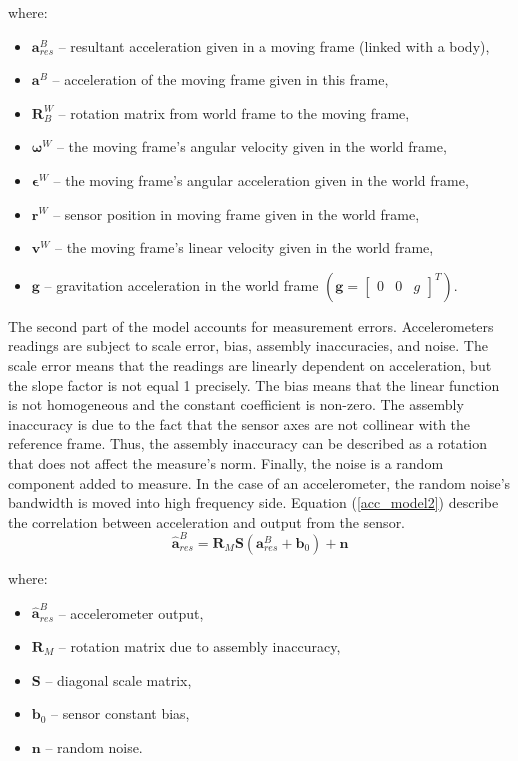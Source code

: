 where:
\begin{itemize}
	\item $\bm{a}_{res}^B$ -- resultant acceleration given in a moving frame (linked with a body),
	\item $\bm{a}^B$ -- acceleration of the moving frame given in this frame,
	\item $\bm{R}^W_B$ -- rotation matrix from world frame to the moving frame,
	\item $\bm{\omega}^W$ -- the moving frame's angular velocity given in the world frame,
	\item $\bm{\epsilon}^W$ -- the moving frame's angular acceleration given in the world frame,
	\item $\bm{r}^W$ -- sensor position in moving frame given in the world frame,
	\item $\bm{v}^W$ -- the moving frame's linear velocity given in the world frame,
	\item $\bm{g}$ -- gravitation acceleration in the world frame $\left( \bm{g} = \begin{bmatrix}
		0 &  0 &  g
	\end{bmatrix}^T \right)$.
\end{itemize}

The second part of the model accounts for measurement errors. Accelerometers readings are subject to scale error, bias, assembly inaccuracies, and noise. The scale error means that the readings are linearly dependent on acceleration, but the slope factor is not equal 1 precisely. The bias means that the linear function is not homogeneous and the constant coefficient is non-zero. The assembly inaccuracy is due to the fact that the sensor axes are not collinear with the reference frame. Thus, the assembly inaccuracy can be described as a rotation that does not affect the measure's norm. Finally, the noise is a random component added to measure. In the case of an accelerometer, the random noise's bandwidth is moved into high frequency side. Equation (\ref{acc_model2}) describe the correlation between acceleration and output from the sensor.\\


\begin{equation}
	\bm{\hat{a}}_{res}^B = \bm{R}_M \bm{S} \left( \bm{a}_{res}^B + \bm{b}_0 \right) + \bm{n}
	\label{acc_model2}
\end{equation}

where:
\begin{itemize}
	\item $\bm{\hat{a}}_{res}^B$ -- accelerometer output,
	\item $\bm{R}_M$ -- rotation matrix due to assembly inaccuracy,
	\item $\bm{S}$ -- diagonal scale matrix,
	\item $\bm{b}_0$ -- sensor constant bias,
	\item $\bm{n}$ -- random noise.	
\end{itemize}


